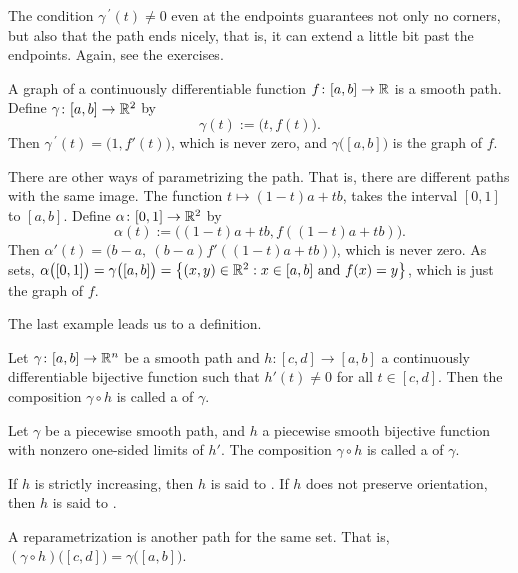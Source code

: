 The condition $\gamma^{\:\prime}(t) \not= 0$ even at the endpoints guarantees
not only no corners, but also that the path ends nicely, that is, it can
extend a little bit past the endpoints.  Again, see the exercises.

\begin{example}
A graph of a continuously differentiable function $f \colon [a,b] \to {\mathbb{R}}$ is a smooth path.
Define $\gamma \colon [a,b] \to {\mathbb{R}}^2$ by
\begin{equation*}
\gamma(t) := \bigl(t,f(t)\bigr) .
\end{equation*}
Then $\gamma^{\:\prime}(t) = \bigl( 1 , f'(t) \bigr)$, which is never zero,
and $\gamma\bigl([a,b]\bigr)$ is the graph of $f$.

There are other ways of parametrizing the path.  That is, there are
different paths with the same image.
The function $t \mapsto (1-t)a+tb$, takes the interval $[0,1]$ to $[a,b]$.
Define
$\alpha \colon [0,1] \to {\mathbb{R}}^2$ by
\begin{equation*}
\alpha(t) := \bigl((1-t)a+tb,f((1-t)a+tb)\bigr) .
\end{equation*}
Then
$\alpha'(t) = \bigl( b-a ,~ (b-a)f'((1-t)a+tb) \bigr)$, which is never zero.
As sets, $\alpha\bigl([0,1]\bigr) = \gamma\bigl([a,b]\bigr)
= \bigl\{ (x,y) \in {\mathbb{R}}^2 : x \in [a,b] \text{ and } f(x) = y \bigr\}$,
which is just the graph of $f$.
\end{example}

The last example leads us to a definition.

\begin{defn}
Let $\gamma \colon [a,b] \to {\mathbb{R}}^n$ be a smooth path and
$h \colon [c,d] \to [a,b]$ a continuously differentiable bijective function
such that $h'(t) \not= 0$ for all $t \in [c,d]$.  Then
the composition
$\gamma \circ h$ is called a
\emph{}
of $\gamma$.

Let $\gamma$ be a piecewise smooth path, and
$h$ a piecewise smooth bijective function with
nonzero one-sided limits of $h'$.
The composition
$\gamma \circ h$ is called a
\emph{} of $\gamma$.

If $h$ is strictly increasing, then $h$ is 
said to \emph{}.  If $h$ does not preserve
orientation, then $h$ is said to \emph{}.
\end{defn}

A reparametrization is another path for the same set.  That is,
$(\gamma \circ h)\bigl([c,d]\bigr) =
\gamma \bigl([a,b]\bigr)$.

